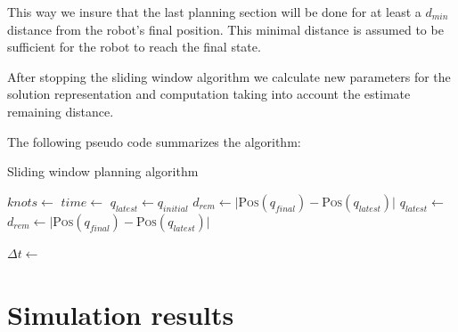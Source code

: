 \documentclass[eprint]{actapoly}
\begin{document}
This way we insure that the last planning section will be done for at least a 
$d_{min}$ distance from the robot's final position.
This minimal distance is assumed to be sufficient for the robot to reach the 
final state.

After stopping the sliding window algorithm we calculate new parameters for the 
solution representation and computation taking into
account the estimate remaining distance.

The following pseudo code summarizes the algorithm: 

\begin{algorithm}
    \caption{Sliding window planning algorithm\label{cod:algo}}
    \label{swpa}
    \begin{algorithmic}[1] %
	    \State $knots \gets $
	    \State $time \gets $
	    \State $q_{latest} \gets q_{initial}$
	    \State $d_{rem} \gets |${\scshape Pos}$(q_{final}) - ${\scshape Pos}$(q_{latest})|$
		\State $q_{latest} \gets $
		\State $d_{rem} \gets |${\scshape Pos}$(q_{final}) - ${\scshape Pos}$(q_{latest})|$
		
	    \EndWhile\label{planningwhile}
	    \State $\Delta t \gets $
	    
        \EndProcedure
    \end{algorithmic}
\end{algorithm}



\section{Simulation results}
\end{document}
